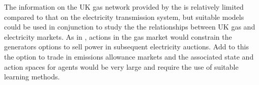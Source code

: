 The information on the UK gas network provided by the  is
relatively limited compared to that on the electricity transmission system,
but suitable models could be used in conjunction to study the the relationships
between UK gas and electricity markets.  As in , actions in
the gas market would constrain the generators options to sell power in subsequent
electricity auctions.  Add to this the option to trade in emissions allowance
markets and the associated state and action spaces for agents would be very
large and require the use of suitable learning methods.

%
%


